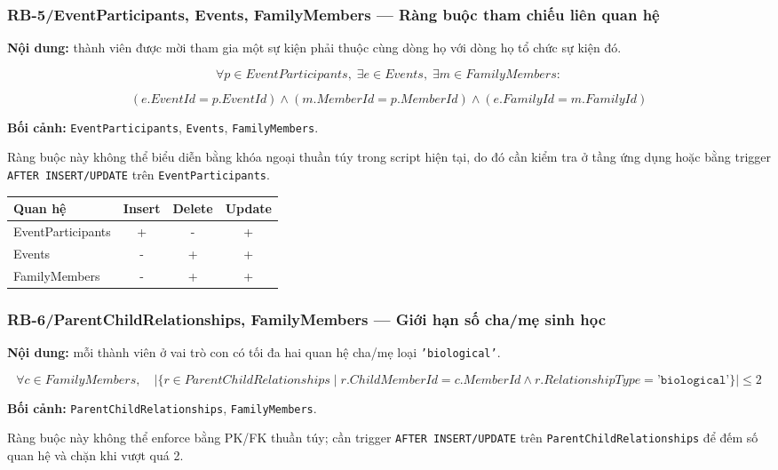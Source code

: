 \subsubsection*{RB-5/EventParticipants, Events, FamilyMembers --- Ràng buộc tham chiếu liên quan hệ}

\textbf{Nội dung:} thành viên được mời tham gia một sự kiện phải thuộc cùng dòng họ với dòng họ tổ chức sự kiện đó.

\[
\forall p\in EventParticipants,\;
\exists e\in Events,\;
\exists m\in FamilyMembers:
\]

\[
(e.EventId=p.EventId)
\land
(m.MemberId=p.MemberId)
\land
(e.FamilyId=m.FamilyId)
\]

\textbf{Bối cảnh:} \texttt{EventParticipants}, \texttt{Events}, \texttt{FamilyMembers}.

Ràng buộc này không thể biểu diễn bằng khóa ngoại thuần túy trong script hiện tại, do đó cần kiểm tra ở tầng ứng dụng hoặc bằng trigger \texttt{AFTER INSERT/UPDATE} trên \texttt{EventParticipants}.

\begin{center}
\begin{tabular}{@{}lccc@{}}
\toprule
\textbf{Quan hệ} & \textbf{Insert} & \textbf{Delete} & \textbf{Update}\\
\midrule
EventParticipants & + & - & +\\
Events & - & + & +\\
FamilyMembers & - & + & +\\
\bottomrule
\end{tabular}
\end{center}

\subsubsection*{RB-6/ParentChildRelationships, FamilyMembers --- Giới hạn số cha/mẹ sinh học}

\textbf{Nội dung:} mỗi thành viên ở vai trò con có tối đa hai quan hệ cha/mẹ loại \texttt{'biological'}.

\[
\forall c\in FamilyMembers,\quad
\left|
\{r\in ParentChildRelationships\mid
r.ChildMemberId=c.MemberId
\land r.RelationshipType=\texttt{'biological'}\}
\right|
\le 2
\]

\textbf{Bối cảnh:} \texttt{ParentChildRelationships}, \texttt{FamilyMembers}.

Ràng buộc này không thể enforce bằng PK/FK thuần túy; cần trigger \texttt{AFTER INSERT/UPDATE} trên \texttt{ParentChildRelationships} để đếm số quan hệ và chặn khi vượt quá 2.

